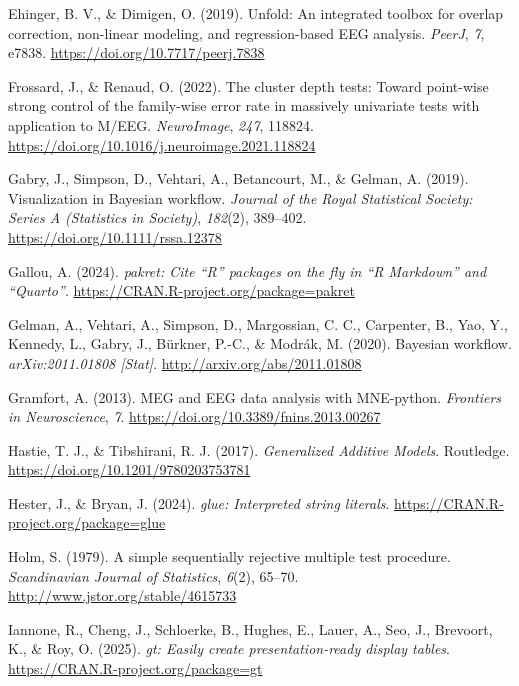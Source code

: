 \documentclass[
  doc,
  floatsintext,
  longtable,
  a4paper,
  nolmodern,
  notxfonts,
  notimes,
  colorlinks=true,linkcolor=blue,citecolor=blue,urlcolor=blue]{apa7}
\newlength{\cslhangindent}
\newenvironment{CSLReferences}[2] %
 {\begin{list}{}{%
  \setlength{\itemindent}{0pt}
  \setlength{\leftmargin}{0pt}
  \setlength{\parsep}{0pt}
  \ifodd #1
   \setlength{\leftmargin}{\cslhangindent}
   \setlength{\itemindent}{-1\cslhangindent}
  \fi
  \setlength{\itemsep}{#2\baselineskip}}}
 {\end{list}}
\begin{document}
\begin{CSLReferences}{1}{0}
Ehinger, B. V., \& Dimigen, O. (2019). Unfold: An integrated toolbox for
overlap correction, non-linear modeling, and regression-based {EEG}
analysis. \emph{PeerJ}, \emph{7}, e7838.
\url{https://doi.org/10.7717/peerj.7838}

Frossard, J., \& Renaud, O. (2022). The cluster depth tests: Toward
point-wise strong control of the family-wise error rate in massively
univariate tests with application to M/EEG. \emph{NeuroImage},
\emph{247}, 118824.
\url{https://doi.org/10.1016/j.neuroimage.2021.118824}

Gabry, J., Simpson, D., Vehtari, A., Betancourt, M., \& Gelman, A.
(2019). Visualization in Bayesian work{fl}ow. \emph{Journal of the Royal
Statistical Society: Series A (Statistics in Society)}, \emph{182}(2),
389--402. \url{https://doi.org/10.1111/rssa.12378}

Gallou, A. (2024). \emph{{pakret}: Cite {``{R}''} packages on the fly in
{``{R Markdown}''} and {``{Quarto}''}}.
\url{https://CRAN.R-project.org/package=pakret}

Gelman, A., Vehtari, A., Simpson, D., Margossian, C. C., Carpenter, B.,
Yao, Y., Kennedy, L., Gabry, J., Bürkner, P.-C., \& Modrák, M. (2020).
Bayesian workflow. \emph{arXiv:2011.01808 {[}Stat{]}}.
\url{http://arxiv.org/abs/2011.01808}

Gramfort, A. (2013). MEG and EEG data analysis with MNE-python.
\emph{Frontiers in Neuroscience}, \emph{7}.
\url{https://doi.org/10.3389/fnins.2013.00267}

Hastie, T. J., \& Tibshirani, R. J. (2017). \emph{Generalized Additive
Models}. Routledge. \url{https://doi.org/10.1201/9780203753781}

Hester, J., \& Bryan, J. (2024). \emph{{glue}: Interpreted string
literals}. \url{https://CRAN.R-project.org/package=glue}

Holm, S. (1979). A simple sequentially rejective multiple test
procedure. \emph{Scandinavian Journal of Statistics}, \emph{6}(2),
65--70. \url{http://www.jstor.org/stable/4615733}

Iannone, R., Cheng, J., Schloerke, B., Hughes, E., Lauer, A., Seo, J.,
Brevoort, K., \& Roy, O. (2025). \emph{{gt}: Easily create
presentation-ready display tables}.
\url{https://CRAN.R-project.org/package=gt}


\end{CSLReferences}
\end{document}
